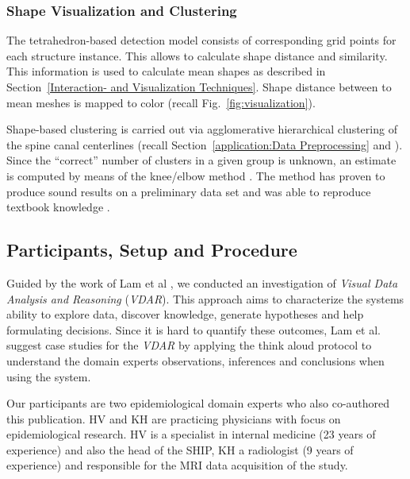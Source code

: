 \documentclass[journal]{style/vgtc} 			          %
\newcommand{\com}[1]{\textcolor{orange}{\uline{#1}}}
\begin{document}
\subsubsection{Shape Visualization and Clustering}
%
The tetrahedron-based detection model consists of corresponding grid points for each structure instance.
%
This allows to calculate shape distance and similarity.
%
This information is used to calculate mean shapes as described in Section~\ref{Interaction- and Visualization Techniques}.
%
Shape distance between to mean meshes is mapped to color (recall Fig.~\ref{fig:visualization}).
%
%

Shape-based clustering is carried out via agglomerative hierarchical clustering of the spine canal centerlines (recall Section~\ref{application:Data Preprocessing} and \cite{Klemm2013VMV}).
%
Since the ``correct'' number of clusters in a given group is unknown, an estimate is computed by means of the knee/elbow method \cite{Salvador2004}.
%
The method has proven to produce sound results on a preliminary data set and was able to reproduce textbook knowledge \cite{Klemm2013VMV}.
\subsection{Participants, Setup and Procedure}
%
%
Guided by the work of Lam et al \cite{Lam2012}, we conducted an investigation of \emph{Visual Data Analysis and Reasoning} (\emph{VDAR}).
%
This approach aims to characterize the systems ability to explore data, discover knowledge, generate hypotheses and help formulating decisions.
%
Since it is hard to quantify these outcomes, Lam et al. suggest case studies for the \emph{VDAR} by applying the think aloud protocol to understand the domain experts observations, inferences and conclusions when using the system.

Our participants are two epidemiological domain experts who also co-authored this publication.
%
HV and KH are practicing physicians with focus on epidemiological research.
%
HV is a specialist in internal medicine (23 years of experience) and also the head of the SHIP, KH a radiologist (9 years of experience) and responsible for the MRI data acquisition of the study. %
%
%
\end{document}
